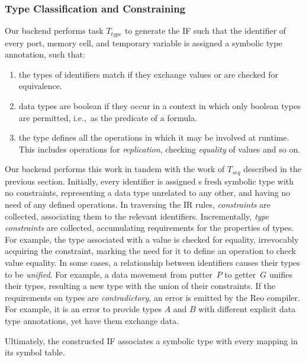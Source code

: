 \subsubsection{Type Classification and Constraining}
Our backend performs task $T_{type}$ to generate the IF such that the identifier of every port, memory cell, and temporary variable is assigned a symbolic type annotation, such that:
\begin{enumerate}
	\item the types of identifiers match if they exchange values or are checked for equivalence.
	\item data types are boolean if they occur in a context in which only boolean types are permitted, i.e.,\ as the predicate of a formula.
	\item the type defines all the operations in which it may be involved at runtime. This includes operations for \textit{replication}, checking \textit{equality} of values and so on.
\end{enumerate}

Our backend performs this work in tandem with the work of $T_{seq}$ described in the previous section. Initially, every identifier is assigned s fresh symbolic type with no constraints, representing a data type unrelated to any other, and having no need of any defined operations. In traversing the IR rules, \textit{constraints} are collected, associating them to the relevant identifiers. Incrementally, \textit{type constraints} are collected, accumulating requirements for the properties of types. For example, the type associated with a value is checked for equality, irrevocably acquiring the  constraint, marking the need for it to define an operation to check value equality. In some cases, a relationship between identifiers causes their types to be \textit{unified}. For example, a data movement from putter~$P$ to getter~$G$ unifies their types, resulting a new type with the union of their constraints. If the requirements on types are \textit{contradictory}, an error is emitted by the Reo compiler. For example, it is an error to provide types $A$ and $B$ with different explicit data type annotations, yet have them exchange data.

Ultimately, the constructed IF associates a symbolic type with every mapping in its symbol table.

